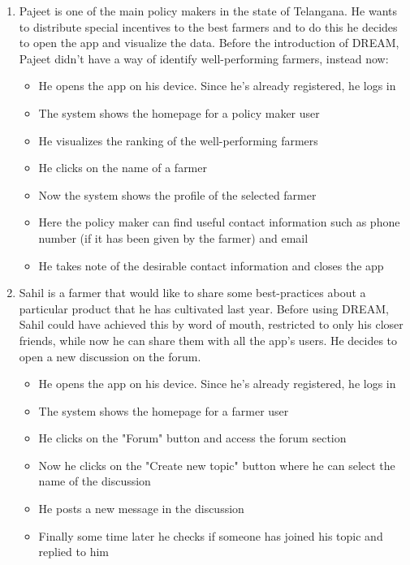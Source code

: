 \documentclass[table, 12pt]{article}
\begin{document}
\begin{enumerate}
    \item Pajeet is one of the main policy makers in the state of Telangana.
    He wants to distribute special incentives to the best farmers and to do this he decides
    to open the app and visualize the data. Before the introduction of DREAM, Pajeet didn't have a way of identify well-performing farmers, instead now:
    \begin{itemize}
        \item He opens the app on his device. Since he's already registered, he logs in
        \item The system shows the homepage for a policy maker user
        \item He visualizes the ranking of the well-performing farmers
        \item He clicks on the name of a farmer
        \item Now the system shows the profile of the selected farmer
        \item Here the policy maker can find useful contact information such as phone number (if it has been given by the farmer) and email
        \item He takes note of the desirable contact information and closes the app
    \end{itemize}

    \item Sahil is a farmer that would like to share some best-practices about a particular product that he has cultivated last year. Before using DREAM, Sahil could have achieved this by word of mouth, restricted to only his closer friends, while now he can share them with all the app's users.
    He decides to open a new discussion on the forum.
    \begin{itemize}
        \item He opens the app on his device. Since he's already registered, he logs in
        \item The system shows the homepage for a farmer user
        \item He clicks on the "Forum" button and access the forum section
        \item Now he clicks on the "Create new topic" button where he can select the name of the discussion
        \item He posts a new message in the discussion
        \item Finally some time later he checks if someone has joined his topic and replied to him
    \end{itemize}


\end{enumerate}
\end{document}
